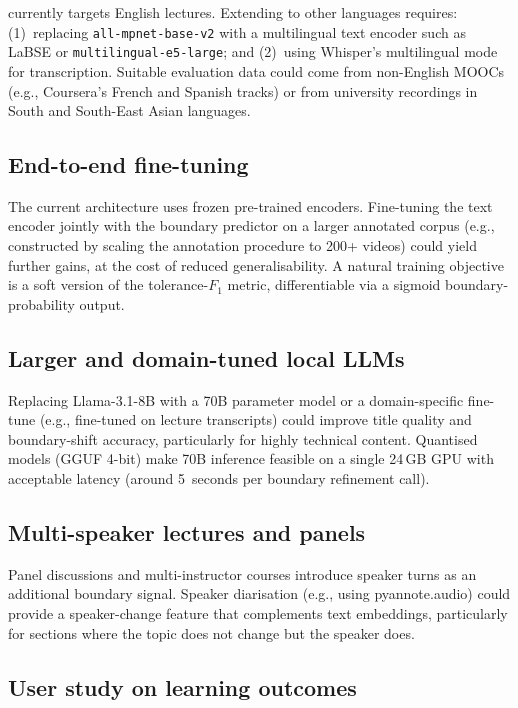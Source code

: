 \lecseg{} currently targets English lectures.
Extending to other languages requires: (1)~replacing \texttt{all-mpnet-base-v2}
with a multilingual text encoder such as LaBSE or \texttt{multilingual-e5-large};
and (2)~using Whisper's multilingual mode for transcription.
Suitable evaluation data could come from non-English MOOCs (e.g.,
Coursera's French and Spanish tracks) or from university recordings in South
and South-East Asian languages.

\subsection{End-to-end fine-tuning}

The current architecture uses frozen pre-trained encoders.
Fine-tuning the text encoder jointly with the boundary predictor on a larger
annotated corpus (e.g., constructed by scaling the \dataset{} annotation
procedure to 200+ videos) could yield further gains, at the cost of reduced
generalisability.
A natural training objective is a soft version of the tolerance-$F_1$ metric,
differentiable via a sigmoid boundary-probability output.

\subsection{Larger and domain-tuned local LLMs}

Replacing Llama-3.1-8B with a 70B parameter model or a domain-specific
fine-tune (e.g., fine-tuned on lecture transcripts) could improve title
quality and boundary-shift accuracy, particularly for highly technical content.
Quantised models (GGUF 4-bit) make 70B inference feasible on a single 24\,GB
GPU with acceptable latency (around 5~seconds per boundary refinement call).

\subsection{Multi-speaker lectures and panels}

Panel discussions and multi-instructor courses introduce speaker turns as an
additional boundary signal.
Speaker diarisation (e.g., using pyannote.audio) could provide a speaker-change
feature that complements text embeddings, particularly for sections where the
topic does not change but the speaker does.

\subsection{User study on learning outcomes}

